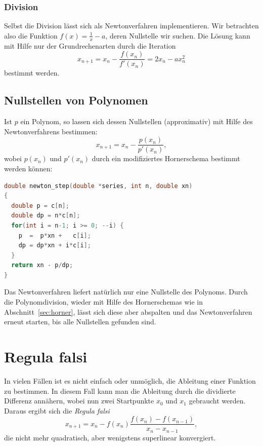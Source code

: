 
\subsubsection{Division}

Selbst die Division lässt sich als Newtonverfahren implementieren. Wir
betrachten also die Funktion $f(x) = \frac{1}{x} - a$, deren
Nullstelle wir suchen. Die Lösung kann mit Hilfe nur der
Grundrechenarten durch die Iteration
\begin{equation}
  x_{n+1} = x_n - \frac{f(x_n)}{f'(x_n)} = 2x_n - a x_n^2 
\end{equation}
bestimmt werden.

\subsection{Nullstellen von Polynomen}

Ist $p$ ein Polynom, so lassen sich dessen Nullstellen (approximativ)
mit Hilfe des Newtonverfahrens bestimmen:
\begin{equation}
  x_{n+1} = x_n - \frac{p(x_n)}{p'(x_n)},
\end{equation}
wobei $p(x_n)$ und $p'(x_n)$ durch ein modifiziertes Hornerschema
bestimmt werden können:
\begin{lstlisting}[language=C]
double newton_step(double *series, int n, double xn)
{
  double p = c[n];
  double dp = n*c[n];
  for(int i = n-1; i >= 0; --i) {
    p  =  p*xn +   c[i];
    dp = dp*xn + i*c[i];
  }
  return xn - p/dp;
}
\end{lstlisting}
Das Newtonverfahren liefert natürlich nur eine Nullstelle des
Polynoms. Durch die Polynomdivision, wieder mit Hilfe des
Hornerschemas wie in Abschnitt~\ref{sec:horner}, lässt sich diese
aber abspalten und das Newtonverfahren erneut starten, bis alle
Nullstellen gefunden sind.

\section{Regula falsi}

In vielen Fällen ist es nicht einfach oder unmöglich, die Ableitung
einer Funktion zu bestimmen. In diesem Fall kann man die Ableitung
durch die dividierte Differenz annähern, wobei nun zwei Startpunkte
$x_0$ und $x_1$ gebraucht werden. Daraus ergibt sich die \emph{Regula
  falsi}
\begin{equation}
  x_{n+1} = x_n - f(x_n)\frac{f(x_n) - f(x_{n-1})}{x_n - x_{n-1}},
\end{equation}
die nicht mehr quadratisch, aber wenigstens superlinear konvergiert.

